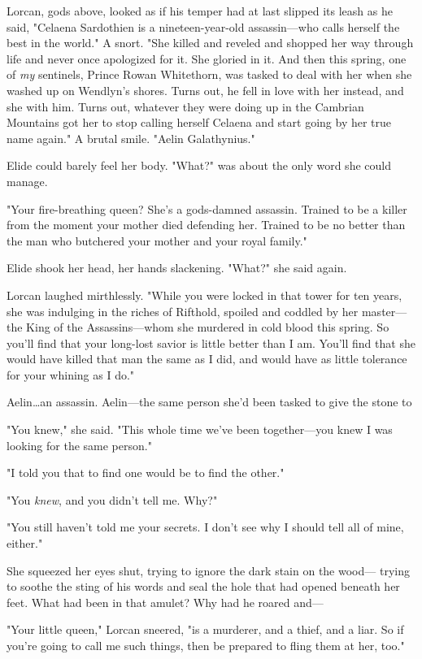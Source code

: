 Lorcan, gods above, looked as if his temper had at last slipped its leash as he said, "Celaena Sardothien is a nineteen-year-old assassin---who calls herself the best in the world."
A snort.
"She killed and reveled and shopped her way through life and never once apologized for it.
She gloried in it.
And then this spring, one of \emph{my} sentinels, Prince Rowan Whitethorn, was tasked to deal with her when she washed up on Wendlyn's shores.
Turns out, he fell in love with her instead, and she with him.
Turns out, whatever they were doing up in the Cambrian Mountains got her to stop calling herself Celaena and start going by her true name again."
A brutal smile.
"Aelin Galathynius."

Elide could barely feel her body.
"What?"
was about the only word she could manage.

"Your fire-breathing queen?
She's a gods-damned assassin.
Trained to be a killer from the moment your mother died defending her.
Trained to be no better than the man who butchered your mother and your royal family."

Elide shook her head, her hands slackening.
"What?"
she said again.

Lorcan laughed mirthlessly.
"While you were locked in that tower for ten years, she was indulging in the riches of Rifthold, spoiled and coddled by her master---the King of the Assassins---whom she murdered in cold blood this spring.
So you'll find that your long-lost savior is little better than I am.
You'll find that she would have killed that man the same as I did, and would have as little tolerance for your whining as I do."

Aelin\ldots an assassin.
Aelin---the same person she'd been tasked to give the stone to 

"You knew," she said.
"This whole time we've been together---you knew I was looking for the same person."

"I told you that to find one would be to find the other."

"You \emph{knew}, and you didn't tell me.
Why?"

"You still haven't told me your secrets.
I don't see why I should tell all of mine, either."

She squeezed her eyes shut, trying to ignore the dark stain on the wood--- trying to soothe the sting of his words and seal the hole that had opened beneath her feet.
What had been in that amulet?
Why had he roared and---

"Your little queen," Lorcan sneered, "is a murderer, and a thief, and a liar.
So if you're going to call me such things, then be prepared to fling them at her, too."

